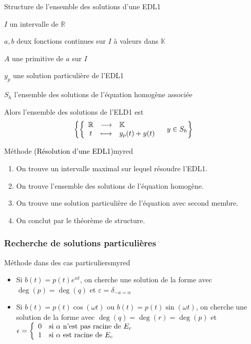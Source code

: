     \begin{theo}{Structure de l’ensemble des solutions d’une EDL1}{}
        \begin{soient}
            \item $I$ un intervalle de $\mathbb{R}$
            \item $a,b$ deux fonctions continues sur $I$ à valeurs dans $\mathbb{K}$
            \item $A$ une primitive de $a$ sur $I$
            \item $y_{p}$ une solution particulière de l’EDL1
            \item $S_h$ l’ensemble des solutions de l’équation homogène associée
        \end{soient}
    Alors l’ensemble des solutions de l’ELD1 est 
    \[ \left\{ \application{\mathbb{R}}{\mathbb{K}}{t}{y_p(t) + y(t)} \quad y \in S_h \right\} \]
    \end{theo}

    \begin{omed}{Méthode \textcolor{black}{(Résolution d’une EDL1)}}{myred}
        \begin{enumerate}
            \item On trouve un intervalle maximal sur lequel résoudre l’EDL1.
            \item On trouve l’ensemble des solutions de l’équation homogène.
            \item On trouve une solution particulière de l’équation avec second membre.
            \item On conclut par le théorème de structure.
        \end{enumerate}
    \end{omed}

    \subsubsection{Recherche de solutions particulières}

    \begin{omed}{Méthode dans des cas particuliers}{myred}
        \begin{itemize}
            \item Si \textcolor{myred}{$b(t) = p(t)e^{\alpha t}$}, on cherche une solution de la forme  avec $\deg(p) = \deg(q)$ et $\varepsilon = \delta_{-a = \alpha}$
            \item Si \textcolor{myred}{$b(t) = p(t)\cos(\omega t)$} ou \textcolor{myred}{$b(t) = p(t)\sin(\omega t)$}, on cherche une solution de la forme  avec $\deg(q) = \deg(r) = \deg(p)$ et $\epsilon = \sisi{0}{\alpha \text{ n’est pas racine de } E_c}{1}{\alpha \text{ est racine de } E_c}$
        \end{itemize}
    \end{omed}

